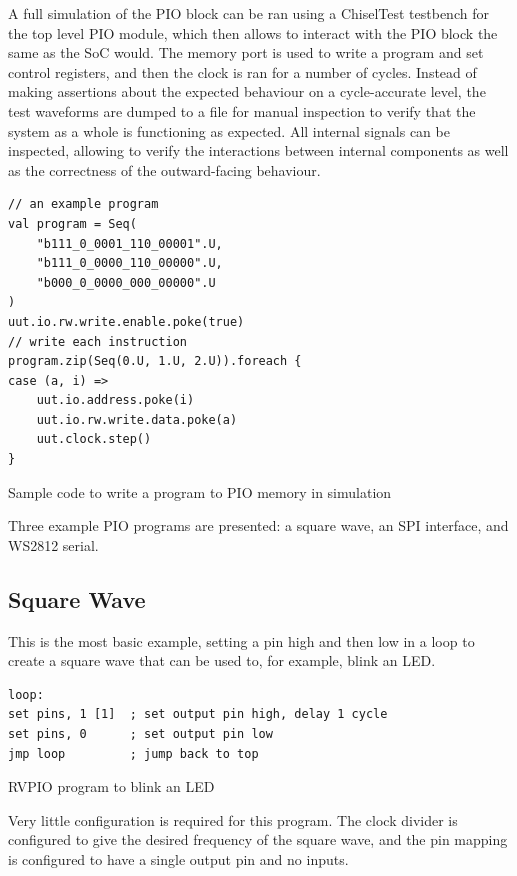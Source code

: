 A full simulation of the PIO block can be ran using a ChiselTest testbench for the top level PIO module, which then allows to interact with the PIO block the same as the SoC would. The memory port is used to write a program and set control registers, and then the clock is ran for a number of cycles. Instead of making assertions about the expected behaviour on a cycle-accurate level, the test waveforms are dumped to a file for manual inspection to verify that the system as a whole is functioning as expected. All internal signals can be inspected, allowing to verify the interactions between internal components as well as the correctness of the outward-facing behaviour.

\begin{listing}[h!]
    \begin{verbatim}
// an example program
val program = Seq(
    "b111_0_0001_110_00001".U,
    "b111_0_0000_110_00000".U, 
    "b000_0_0000_000_00000".U  
)
uut.io.rw.write.enable.poke(true)
// write each instruction
program.zip(Seq(0.U, 1.U, 2.U)).foreach {
case (a, i) =>
    uut.io.address.poke(i)
    uut.io.rw.write.data.poke(a)
    uut.clock.step()
}
    \end{verbatim}
    \caption{Sample code to write a program to PIO memory in simulation}
    \label{lst:sim-write-prog}
\end{listing}

Three example PIO programs are presented: a square wave, an SPI interface, and WS2812 serial.

\subsection{Square Wave}
\label{sec:blink-sim}

This is the most basic example, setting a pin high and then low in a loop to create a square wave that can be used to, for example, blink an LED.

\begin{listing}[h!]
    \begin{verbatim}
loop:
set pins, 1 [1]  ; set output pin high, delay 1 cycle
set pins, 0      ; set output pin low
jmp loop         ; jump back to top
    \end{verbatim}
    \caption{RVPIO program to blink an LED}
    \label{lst:blinky}
\end{listing}

Very little configuration is required for this program. The clock divider is configured to give the desired frequency of the square wave, and the pin mapping is configured to have a single output pin and no inputs.


